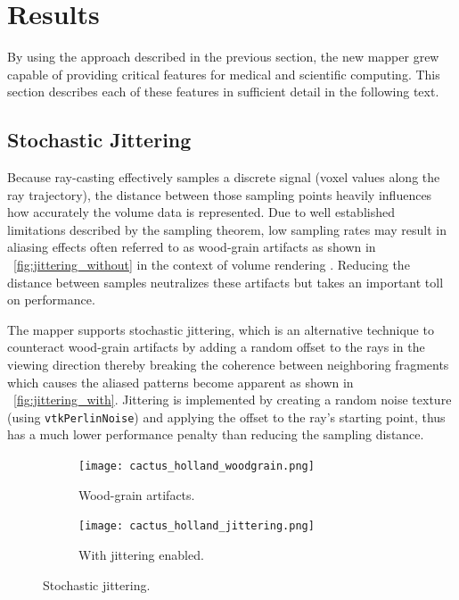 \section{Results}
\label{results}
By using the approach described in the previous section, the new mapper grew
capable of providing critical features for medical and scientific computing.
This section describes each of these features in sufficient detail in the
following text.

\newcommand{\ignore}[1]{}

\subsection{Stochastic Jittering}
Because ray-casting effectively samples a discrete signal (voxel values along
the ray trajectory), the distance between those sampling points heavily
influences how accurately the volume data is represented.  Due to well
established limitations described by the sampling theorem, low sampling rates
may result in aliasing effects often referred to as wood-grain artifacts
as shown in ~\autoref{fig:jittering_without} in the context of volume rendering
\ignore{~\citep{RTVG_jittering}}. Reducing the distance between samples
neutralizes these artifacts but takes an important toll on performance.

The mapper supports stochastic jittering, which is an alternative technique to
counteract wood-grain artifacts by adding a random offset to the rays in the
viewing direction thereby breaking the coherence between neighboring fragments
which causes the aliased patterns become apparent
as shown in ~\autoref{fig:jittering_with}.  Jittering is implemented by creating a
random noise texture (using \texttt{vtkPerlinNoise}) and applying the offset to
the ray's starting point, thus has a much lower performance penalty than
reducing the sampling distance.

\begin{figure}[htb]
\centering
  \begin{subfigure}[b]{.5\columnwidth}
    \centering
    \texttt{[image: cactus\_holland\_woodgrain.png]}
    \caption{Wood-grain artifacts.}
    \label{fig:jittering_without}
  \end{subfigure}%
  \begin{subfigure}[b]{.5\columnwidth}
    \centering
    \texttt{[image: cactus\_holland\_jittering.png]}
    \caption{With jittering enabled.}
    \label{fig:jittering_with}
  \end{subfigure}
  \caption{Stochastic jittering.}
  \label{fig:jittering}
\end{figure}

